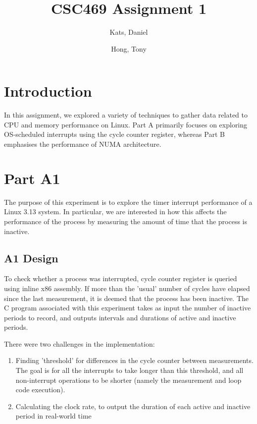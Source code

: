 \documentclass[a4paper, 12pt]{article}
\begin{document}
\begin{titlepage}
\title{CSC469 Assignment 1}
\author{Kats, Daniel \and Hong, Tony}
\clearpage
\maketitle
\thispagestyle{empty}
\end{titlepage}

\section{Introduction}

In this assignment, we explored a variety of techniques to gather data related to CPU and memory performance on Linux. Part A primarily focuses on exploring OS-scheduled interrupts using the cycle counter register, whereas Part B emphasises the performance of NUMA architecture.

\section{Part A1}

The purpose of this experiment is to explore the timer interrupt performance of a Linux 3.13 system. In particular, we are interested in how this affects the performance of the process by measuring the amount of time that the process is inactive.

\subsection{A1 Design}
To check whether a process was interrupted, cycle counter register is queried using inline x86 assembly. If more than the 'usual' number of cycles have elapsed since the last measurement, it is deemed that the process has been inactive. The C program associated with this experiment takes as input the number of inactive periods to record, and outputs intervals and durations of active and inactive periods.

There were two challenges in the implementation:
\begin{enumerate}
\item   Finding 'threshold' for differences in the cycle counter between measurements. The goal is for all the interrupts to take longer than this threshold, and all non-interrupt operations to be shorter (namely the measurement and loop code execution).
\item   Calculating the clock rate, to output the duration of each active and inactive period in real-world time
\end{enumerate}
\end{document}
